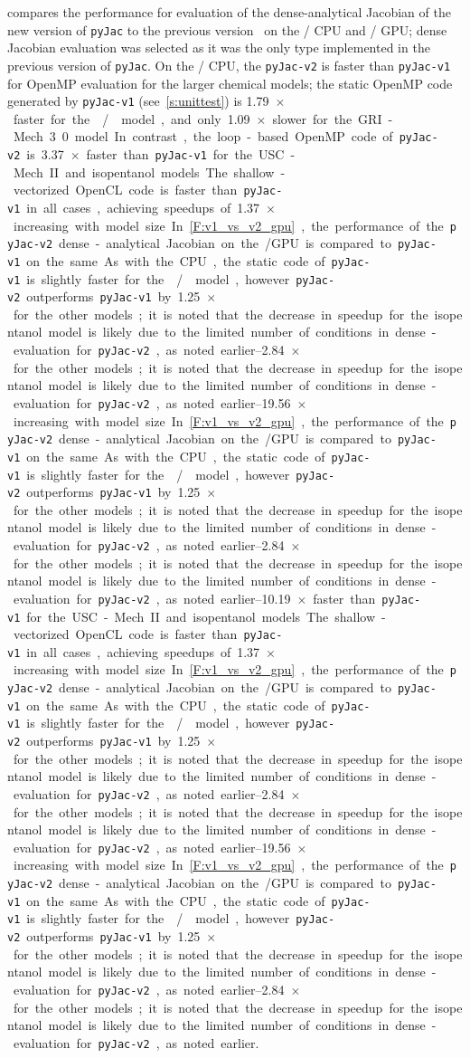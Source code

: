 \documentclass[12pt,number,sort&compress,preprint]{elsarticle}
\begin{document}
 compares the performance for evaluation of the dense-analytical Jacobian of the new version of \texttt{pyJac} to the previous version~\cite{pyjac16} on the \sse/ CPU and \gpuold/ GPU; dense Jacobian evaluation was selected as it was the only type implemented in the previous version of \texttt{pyJac}.
On the \sse/ CPU, the \texttt{pyJac-v2} is faster than \texttt{pyJac-v1} for OpenMP evaluation for the larger chemical models; the static OpenMP code generated by \texttt{pyJac-v1} (see~\cref{s:unittest}) is \SI{1.79}{$\times$} faster for the \slash{} model, and only \SI{1.09}{$\times$} slower for the GRI-Mech 3.0 model.
In contrast, the loop-based OpenMP code of \texttt{pyJac-v2} is \SIrange{3.37}{10.19}{$\times$} faster than \texttt{pyJac-v1} for the USC-Mech II and isopentanol models.
The shallow-vectorized OpenCL code is faster than \texttt{pyJac-v1} in all cases, achieving speedups of \SIrange{1.37}{19.56}{$\times$} increasing with model size.
In~\cref{F:v1_vs_v2_gpu}, the performance of the \texttt{pyJac-v2} dense-analytical Jacobian on the \gpuold/ GPU is compared to \texttt{pyJac-v1} on the same.
As with the CPU, the static code of \texttt{pyJac-v1} is slightly faster for the \slash{} model, however \texttt{pyJac-v2} outperforms \texttt{pyJac-v1} by \SIrange{1.25}{2.84}{$\times$} for the other models; it is noted that the decrease in speedup for the isopentanol model is likely due to the limited number of conditions in dense-evaluation for \texttt{pyJac-v2}, as noted earlier.
\end{document}
